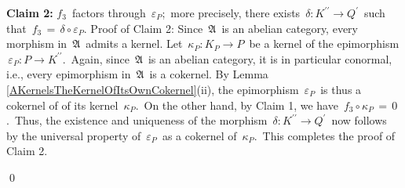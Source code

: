 \begin{enumerate}
	\vskip 0.3cm
	\textbf{Claim 2:} \;$f_{3}$\, factors through \,$\varepsilon_{P}$;\,
	more precisely, there exists
	\,$\delta : K^{\prime\prime} \longrightarrow Q^{\prime}$\,
	such that
	\,$f_{3} \,=\, \delta \circ \varepsilon_{P}$.
	\vskip 0.01cm
	Proof of Claim 2:\;
	Since \,$\mathfrak{A}$\, is an abelian category, every morphism in \,$\mathfrak{A}$\,
	admits a kernel.
	Let \,$\kappa_{P} : K_{P} \longrightarrow P$\, be a kernel of the epimorphism
	\,$\varepsilon_{P} : P \longrightarrow K^{\prime\prime}$.\,
	Again, since \,$\mathfrak{A}$\, is an abelian category, it is in particular conormal, i.e.,
	every epimorphism in \,$\mathfrak{A}$\, is a cokernel.
	By Lemma \ref{AKernelsTheKernelOfItsOwnCokernel}(ii),
	the epimorphism \,$\varepsilon_{P}$\, is thus a cokernel of of its kernel \,$\kappa_{P}$.\,
	On the other hand, by Claim 1, we have \,$f_{3} \circ \kappa_{P} \,=\, 0$.\,
	Thus, the existence and uniqueness of the morphism
	\,$\delta : K^{\prime\prime} \longrightarrow Q^{\prime}$\,
	now follows by the universal property of
	\,$\varepsilon_{P}$\, as a cokernel of \,$\kappa_{P}$.\,
	This completes the proof of Claim 2.
\end{enumerate}
\qed


